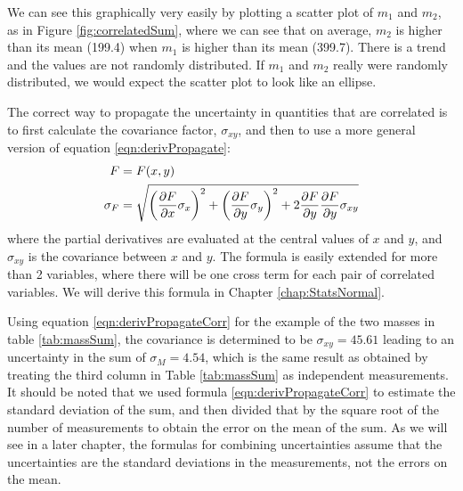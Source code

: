 We can see this graphically very easily by plotting a scatter plot of $m_1$ and $m_2$, as in Figure \ref{fig:correlatedSum}, where we can see that on average, $m_2$ is higher than its mean (199.4) when $m_1$ is higher than its mean (399.7). There is a trend and the values are not randomly distributed. If $m_1$ and $m_2$ really were randomly distributed, we would expect the scatter plot to look like an ellipse. 


The correct way to propagate the uncertainty in quantities that are correlated is to first calculate the covariance factor, $\sigma_{xy}$, and then to use a more general version of equation \ref{eqn:derivPropagate}:
\begin{align}
\label{eqn:derivPropagateCorr}
F&=F(x,y)\nonumber\\
\sigma_F &= \sqrt{\left(\frac{\partial F}{\partial x}\sigma_x\right)^2 + \left(\frac{\partial F}{\partial y} \sigma_y\right)^2+2\frac{\partial F}{\partial y}\frac{\partial F}{\partial y}\sigma_{xy}}
\end{align}
where the partial derivatives are evaluated at the central values of $x$ and $y$, and $\sigma_{xy}$ is the covariance between $x$ and $y$. The formula is easily extended for more than 2 variables, where there will be one cross term for each pair of correlated variables. We will derive this formula in Chapter \ref{chap:StatsNormal}.

Using equation \ref{eqn:derivPropagateCorr} for the example of the two masses in table \ref{tab:massSum}, the covariance is determined to be $\sigma_{xy}=45.61$ leading to an uncertainty in the sum of $\sigma_M=4.54$, which is the same result as obtained by treating the third column in Table \ref{tab:massSum} as independent measurements. It should be noted that we used formula \ref{eqn:derivPropagateCorr} to estimate the standard deviation of the sum, and then divided that by the square root of the number of measurements to obtain the error on the mean of the sum. As we will see in a later chapter, the formulas for combining uncertainties assume that the uncertainties are the standard deviations in the measurements, not the errors on the mean. 

